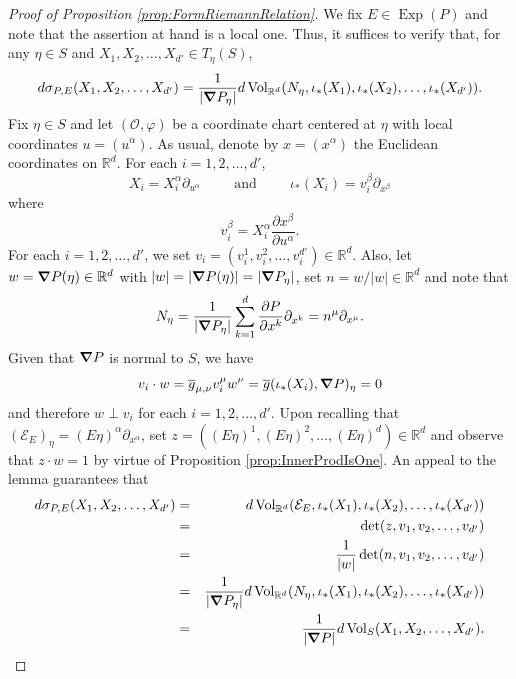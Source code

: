 \documentclass[11pt, letter]{book}
\newcommand\Exp{\operatorname{Exp}}
\renewcommand\det{\operatorname{det}}
\newcommand{\Vol}{\operatorname{Vol}}
\begin{document}
\begin{proof}[Proof of Proposition \ref{prop:FormRiemannRelation}]
We fix $E\in\Exp(P)$ and note that the assertion at hand is a local one. Thus, it suffices to verify that, for any $\eta\in S$ and $X_1,X_2,\dots,X_{d'}\in T_\eta(S)$, 
\begin{equation*}
    d\sigma_{P,E}(X_1,X_2,\dots,X_{d'})=\frac{1}{|\grad P_{\eta}|}d\Vol_{\mathbb{R}^d}(N_\eta,\iota_*(X_1),\iota_*(X_2),\dots,\iota_*(X_{d'})).
\end{equation*}
Fix $\eta\in S$ and let $(\mathcal{O},\varphi)$ be a coordinate chart centered at $\eta$ with local coordinates $u=(u^{\alpha})$. As usual, denote by $x=(x^{\alpha})$ the Euclidean coordinates on $\mathbb{R}^d$.  For each $i=1,2,\dots,{d'}$, \begin{equation*}
X_i=X_i^\alpha \partial_{u^{\alpha}}\hspace{1cm}\mbox{and}\hspace{1cm}\iota_*(X_i)=v_i^\beta\partial_{x^{\beta}}
\end{equation*}
where
\begin{equation*}
v_i^\beta =X_i^\alpha\frac{\partial x^\beta}{\partial u^\alpha}.
\end{equation*}
For each $i=1,2,\dots,d'$, we set $v_i=(v_i^1,v_i^2,\dots,v_i^{d'})\in\mathbb{R}^d$. Also, let $w=\grad P(\eta)\in\mathbb{R}^d$ with $|w|=|\grad P(\eta)|=|\grad P_\eta|$, set $n=w/|w|\in\mathbb{R}^d$ and note that
\begin{equation*}
    N_\eta=\frac{1}{|\grad P_\eta|}\sum_{k=1}^d\frac{\partial P}{\partial x^{k}}\partial_{x^k}=n^{\mu}\partial_{x^\mu}.
\end{equation*}Given that $\grad P$ is normal to $S$, we have
\begin{equation*}
    v_i\cdot w=\overline{g}_{\mu,\nu}v_i^\mu w^\nu= \overline{g}(\iota_*(X_i),\grad P)_\eta=0
\end{equation*}
and therefore $w\perp v_i$ for each $i=1,2,\dots,{d'}$. Upon recalling that $(\mathcal{E}_E)_\eta=(E\eta)^\alpha\partial_{x^{\alpha}}$, set $z=((E\eta)^1,(E\eta)^2,\dots,(E\eta)^d)\in\mathbb{R}^d$ and observe that $z\cdot w=1$ by virtue of Proposition \ref{prop:InnerProdIsOne}. An appeal to the lemma guarantees that
\begin{eqnarray*}
d\sigma_{P,E}(X_1,X_2,\dots,X_{d'})&=&d\Vol_{\mathbb{R}^d}(\mathcal{E}_E,\iota_*(X_1),\iota_*(X_2),\dots,\iota_*(X_{d'}))\\
&=&\det(z,v_1,v_2,\dots,v_{d'})\\
&=&\frac{1}{|w|}\det(n,v_1,v_2,\dots,v_{d'})\\
&=&\frac{1}{|\grad P_\eta|}d\Vol_{\mathbb{R}^d}(N_\eta,\iota_*(X_1),\iota_*(X_2),\dots,\iota_*(X_{d'}))\\
&=&\frac{1}{|\grad P|}d\Vol_S(X_1,X_2,\dots,X_{d'}).
\end{eqnarray*}
\end{proof}
\end{document}

